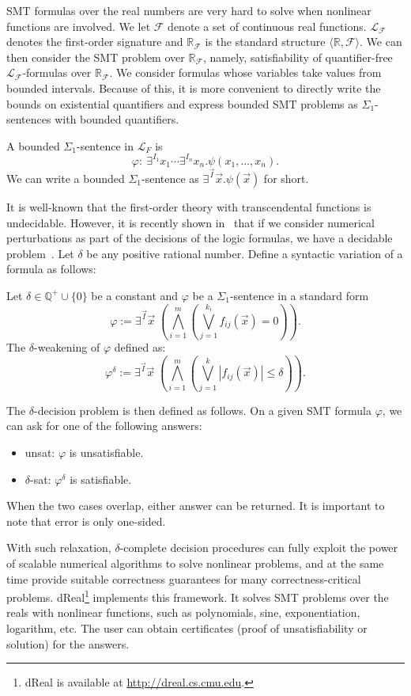 SMT formulas over the real numbers are very hard to solve when nonlinear functions are involved. 
We let $\mathcal{F}$ denote a set of continuous real functions. $\mathcal{L}_{\mathcal{F}}$ denotes the first-order signature and $\mathbb{R}_{\mathcal{F}}$ is the standard structure $\langle \mathbb{R}, \mathcal{F}\rangle$. We can then consider the SMT problem over $\mathbb{R}_{\mathcal{F}}$, namely, satisfiability of quantifier-free $\mathcal{L}_{\mathcal{F}}$-formulas over $\mathbb{R}_{\mathcal{F}}$. We consider formulas whose variables take values from bounded intervals. Because of this, it is more convenient to directly write the bounds on existential quantifiers and express bounded SMT problems as $\Sigma_1$-sentences with bounded quantifiers.
\begin{definition}
A bounded $\Sigma_1$-sentence in $\mathcal{L}_{F}$ is
$$\varphi:\ \exists^{I_1}x_1\cdots \exists^{I_n}x_n. \psi(x_1,...,x_n).$$
We can write a bounded $\Sigma_1$-sentence as $\exists^{\vec I}\vec x.\psi(\vec x)$ for short.
\end{definition}
It is well-known that the first-order theory with transcendental functions is undecidable. However, it is recently shown in~\cite{} that if we consider numerical perturbations as part of the decisions of the logic formulas, we have a decidable problem~\cite{}. Let $\delta$ be any positive rational number. Define a syntactic variation of a formula as follows:
\begin{definition}
Let $\delta\in \mathbb{Q}^+\cup\{0\}$ be a constant and $\varphi$ be a
$\Sigma_1$-sentence in a standard form 
$$\varphi:= \exists^{\vec I}\vec
x\;(\bigwedge_{i=1}^m (\bigvee_{j=1}^{k_i}
f_{ij}(\vec x)= 0)).$$The $\delta$-weakening of $\varphi$ defined as:
$$\varphi^{\delta}:= \exists^{\vec I} \vec x\;(\bigwedge_{i=1}^m(\bigvee_{j=1}^k
|f_{ij}(\vec x)|\leq \delta)).$$
\end{definition}
The $\delta$-decision problem is then defined as follows. On a given SMT formula $\varphi$, we can ask for one of the following answers:
\begin{itemize}
 \item {\sf unsat}: $\varphi$ is unsatisfiable.
 \item {\sf $\delta$-sat}: $\varphi^{\delta}$ is satisfiable.
\end{itemize}
When the two cases overlap, either answer can be returned. It is important to note that error is only one-sided. 

With such relaxation, $\delta$-complete decision procedures can fully exploit the power of scalable numerical algorithms to solve nonlinear problems, and at the same time provide suitable correctness guarantees for many correctness-critical problems. {\sf dReal}\footnote{{\sf dReal} is available at \url{http://dreal.cs.cmu.edu}.} implements this framework. It solves SMT problems over the reals with nonlinear functions, such as polynomials, sine, exponentiation, logarithm, etc. The user can obtain certificates (proof of unsatisfiability or solution) for the answers.

